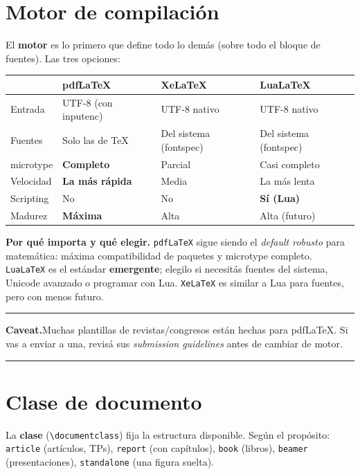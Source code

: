 \documentclass[11pt,a4paper]{article}
\newcommand{\C}[1]{\texttt{\textbackslash #1}}
\newcommand{\pkg}[1]{\textsf{#1}}
\newenvironment{nota}{\par\smallskip\noindent\begin{center}%
  \begin{minipage}{0.95\linewidth}\small\rule{\linewidth}{0.4pt}\par\nobreak}%
  {\par\rule{\linewidth}{0.4pt}\end{minipage}\end{center}\smallskip}
\begin{document}
\section{Motor de compilación}
El \textbf{motor} es lo primero que define todo lo demás (sobre todo el bloque de
fuentes). Las tres opciones:

\begin{center}\small
\renewcommand{\arraystretch}{1.3}
\begin{tabularx}{\linewidth}{@{}l XXX@{}}
\toprule
 & \textbf{pdfLaTeX} & \textbf{XeLaTeX} & \textbf{LuaLaTeX} \\
\midrule
Entrada & UTF-8 (con \pkg{inputenc}) & UTF-8 nativo & UTF-8 nativo \\
Fuentes & Solo las de TeX & Del sistema (\pkg{fontspec}) & Del sistema (\pkg{fontspec}) \\
\pkg{microtype} & \textbf{Completo} & Parcial & Casi completo \\
Velocidad & \textbf{La más rápida} & Media & La más lenta \\
Scripting & No & No & \textbf{Sí (Lua)} \\
Madurez & \textbf{Máxima} & Alta & Alta (futuro) \\
\bottomrule
\end{tabularx}
\end{center}

\noindent\textbf{Por qué importa y qué elegir.} \texttt{pdfLaTeX} sigue siendo el
\emph{default robusto} para matemática: máxima compatibilidad de paquetes y
\pkg{microtype} completo. \texttt{LuaLaTeX} es el estándar \textbf{emergente};
elegilo si necesitás fuentes del sistema, Unicode avanzado o programar con Lua.
\texttt{XeLaTeX} es similar a Lua para fuentes, pero con menos futuro.

\begin{nota}
\textbf{Caveat.}\enspace Muchas plantillas de revistas/congresos están hechas para
pdfLaTeX. Si vas a enviar a una, revisá sus \emph{submission guidelines} antes de
cambiar de motor.
\end{nota}

\section{Clase de documento}
La \textbf{clase} (\C{documentclass}) fija la estructura disponible. Según el
propósito: \texttt{article} (artículos, TPs), \texttt{report} (con capítulos),
\texttt{book} (libros), \texttt{beamer} (presentaciones), \texttt{standalone}
(una figura suelta).
\end{document}
